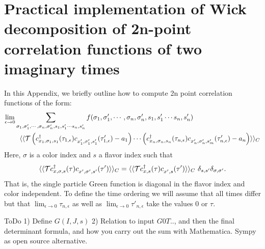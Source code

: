 

\section{Practical implementation of Wick decomposition of 2n-point correlation functions of two imaginary times } \label{sec:wick}

In this Appendix,  we briefly  outline how to compute 2n point correlation functions   of the form: 
\begin{align}
	\lim_{\epsilon \rightarrow 0  } & \sum_{\sigma_1, \sigma'_1, \cdots, \sigma_n, \sigma'_n,  s_1, s'_1  \cdots s_n,  s'_n  }  f( \sigma_1, \sigma'_1, \cdots, \sigma_n, \sigma'_n,  s_1, s'_1  \cdots s_n,  s'_n ) 
	\nonumber    \\
         &  \, \, \, \,        \langle \langle {\cal T}  \left( c^{\dagger}_{x_1,\sigma_1,s_1}(\tau_{1,\epsilon}) c^{\phantom\dagger}_{x'_{1},\sigma'_1,s'_1}(\tau'_{1,\epsilon}) - a_1  \right)  \cdots 
	    \left( c^{\dagger}_{x_n,\sigma_n,s_n}(\tau_{n,\epsilon}) c^{\phantom\dagger}_{x'_{n},\sigma'_n,s'_m} (\tau'_{n,\epsilon}) - a_n  \right)   \rangle \rangle_C
\end{align}
Here,  $ \sigma $ is a color  index and $s$ a flavor index such that 
\begin{equation}
	\langle \langle {\cal T}  c^{\dagger}_{x,\sigma,s}(\tau) c^{\phantom\dagger}_{x',\sigma',s'}(\tau')  \rangle \rangle_C  = 
	\langle \langle {\cal T}  c^{\dagger}_{x,s}(\tau) c^{\phantom\dagger}_{x',s}(\tau')  \rangle \rangle_C  \, \, \delta_{s,s'} \delta_{\sigma,\sigma'}.
\end{equation}
That is, the single particle Green function is diagonal in the flavor index  and color  independent.   To  define the time ordering we will assume  that all times differ  but that $  \lim_{\epsilon \rightarrow 0 }    \tau_{n,\epsilon}  $   as well as $ \lim_{\epsilon \rightarrow 0 }    \tau'_{n,\epsilon} $  take the values $0$  or $\tau$.  

{\color{red}  ToDo   1) Define $G(I,J,s)$  2) Relation to input  $G0T ..$, and then the final  determinant formula, and how you carry out the sum   with Mathematica.   Sympy as open source alternative.   }  


